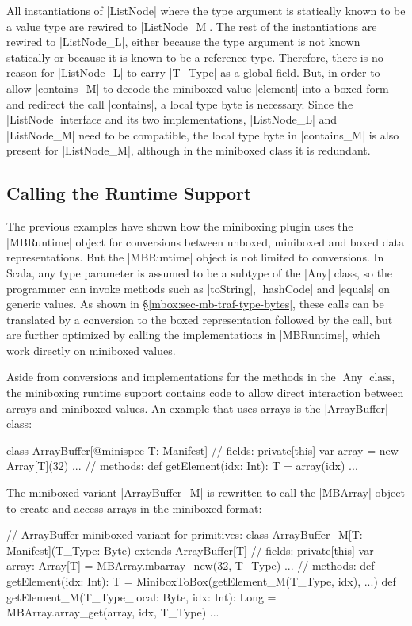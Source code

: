 All instantiations of |ListNode| where the type argument is statically known to be a value type are rewired to |ListNode_M|. The rest of the instantiations are rewired to |ListNode_L|, either because the type argument is not known statically or because it is known to be a reference type. Therefore, there is no reason for |ListNode_L| to carry |T_Type| as a global field. But, in order to allow |contains_M| to decode the miniboxed value |element| into a boxed form and redirect the call |contains|, a local type byte is necessary. Since the |ListNode| interface and its two implementations, |ListNode_L| and |ListNode_M| need to be compatible, the local type byte in |contains_M| is also present for |ListNode_M|, although in the miniboxed class it is redundant.

\subsection{Calling the Runtime Support}
\label{mbox:sec-mb-traf-runtime}

The previous examples have shown how the miniboxing plugin uses the |MBRuntime| object for conversions between unboxed, miniboxed and boxed data representations. But the |MBRuntime| object is not limited to conversions. In Scala, any type parameter is assumed to be a subtype of the |Any| class, so the programmer can invoke methods such as |toString|, |hashCode| and |equals| on generic values. As shown in \S\ref{mbox:sec-mb-traf-type-bytes}, these calls can be translated by a conversion to the boxed representation followed by the call, but are further optimized by calling the implementations in |MBRuntime|, which work directly on miniboxed values.

Aside from conversions and implementations for the methods in the |Any| class, the miniboxing runtime support contains code to allow direct interaction between arrays and miniboxed values. An example that uses arrays is the |ArrayBuffer| class:

\begin{lstlisting-nobreak}
 class ArrayBuffer[@minispec T: Manifest] {
   // fields:
   private[this] var array = new Array[T](32)
   ...
   // methods:
   def getElement(idx: Int): T = array(idx)
   ...
 }
\end{lstlisting-nobreak}

The miniboxed variant |ArrayBuffer_M| is rewritten to call the |MBArray| object to create and access arrays in the miniboxed format:

\begin{lstlisting-nobreak}
 // ArrayBuffer miniboxed variant for primitives:
 class ArrayBuffer_M[T: Manifest](T_Type: Byte)
                               extends ArrayBuffer[T] {
   // fields:
   private[this] var array: Array[T] = MBArray.mbarray_new(32, T_Type)
   ...
   // methods:
   def getElement(idx: Int): T =
       MiniboxToBox(getElement_M(T_Type, idx), ...)
   def getElement_M(T_Type_local: Byte, idx: Int): Long =
       MBArray.array_get(array, idx, T_Type)
   ...
 }
\end{lstlisting-nobreak}


